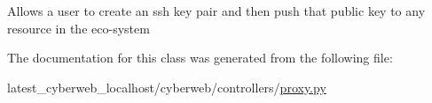 \begin{DoxyVerb}
Allows a user to create an ssh key pair and then push that public key to 
any resource in the eco-system
\end{DoxyVerb}
 

\-The documentation for this class was generated from the following file\-:\begin{DoxyCompactItemize}
\item 
latest\-\_\-cyberweb\-\_\-localhost/cyberweb/controllers/\hyperlink{proxy_8py}{proxy.\-py}\end{DoxyCompactItemize}
